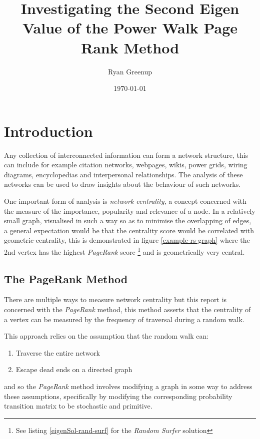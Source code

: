 \documentclass[11pt]{report}
\author{Ryan Greenup}
\date{\today}
\title{Investigating the Second Eigen Value of the Power Walk Page Rank Method}
\begin{document}
\maketitle
\tableofcontents



\section{Introduction}
\label{sec:org93e4f0c}
Any collection of interconnected information can form a network structure,
this can include for example citation networks, webpages, wikis, power grids, wiring diagrams, encyclopedias and interpersonal
relationships. The analysis of these networks can be used to draw insights about
the behaviour of such networks.

One important form of analysis is \emph{network centrality}, a concept concerned with
the measure of the importance, popularity and relevance of a node. In a
relatively small graph, visualised in such a way so as to minimise the
overlapping of edges, a general expectation would be that the centrality score
would be correlated with geometric-centrality, this is demonstrated in figure
\ref{example-rs-graph} where the 2nd vertex has the highest \emph{PageRank} score \footnote{See listing \ref{eigenSol-rand-surf} for the \textit{Random Surfer} solution } and
is geometrically very central.

\subsection{The PageRank Method}
\label{sec:org9a3667e}

There are multiple ways to measure network centrality but this report is
concerned with the \emph{PageRank} method, this method asserts that the centrality of
a vertex can be measured by the frequency of traversal during a random walk.

This approach relies on the assumption that the random walk can:

\begin{enumerate}
\item Traverse the entire network
\item Escape dead ends on a directed graph
\end{enumerate}


and so the \emph{PageRank} method involves modifying a graph in some way to address
these assumptions, specifically by modifying the corresponding probability
transition matrix to be stochastic and primitive.
\end{document}
